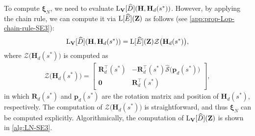 To compute $\boldsymbol{\xi}_N$, we need to evaluate $\operatorname{L}_\mathbf{V}[\widehat{D}](\mathbf{H}, \mathbf{H}_d(s^*))$. However, by applying the chain rule, we can compute it via $\operatorname{L}[\widehat{E}](\mathbf{Z})$ as follows (see \cref{app:prop-Lop-chain-rule-SE3}):
\begin{align}
    \operatorname{L}_\mathbf{V}[\widehat{D}](\mathbf{H}, \mathbf{H}_d(s^*)) = \operatorname{L}[\widehat{E}](\mathbf{Z})\mathcal{Z}\bigl(\mathbf{H}_d(s^*)\bigr),
\end{align}
where $\mathcal{Z}\bigl(\mathbf{H}_d(s^*)\bigr)$ is computed as
\begin{align}
    \mathcal{Z}\bigl(\mathbf{H}_d(s^*)\bigr) = \begin{bmatrix}
        \mathbf{R}_d^\top(s^*) & -\mathbf{R}_d^\top(s^*)\widehat{\mathcal{S}}\bigl(\mathbf{p}_d(s^*)\bigr)\\
        \mathbf{0} & \mathbf{R}_d^\top(s^*)
    \end{bmatrix}, \label{eq:explicit-EE-dista-SE3-component-Zmap}
\end{align}
in which $\mathbf{R}_d(s^*)$ and $\mathbf{p}_d(s^*)$ are the rotation matrix and position of $\mathbf{H}_d(s^*)$, respectively. The computation of $\mathcal{Z}\bigl(\mathbf{H}_d(s^*)\bigr)$ is straightforward, and thus $\boldsymbol{\xi}_N$ can be computed explicitly. Algorithmically, the computation of $\operatorname{L}_\mathbf{V}[\widehat{D}](\mathbf{Z})$ is shown in \cref{alg:LN-SE3}.

